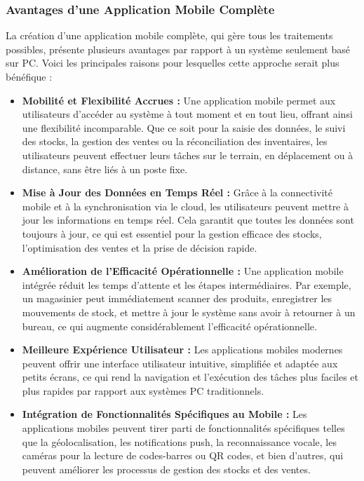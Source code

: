 \documentclass[a4paper, oneside, 12pt, final]{extreport}
\begin{document}
\subsubsection{Avantages d'une Application Mobile Complète}
La création d'une application mobile complète, qui gère tous les traitements possibles, présente plusieurs avantages par rapport à un système seulement basé sur PC. Voici les principales raisons pour lesquelles cette approche serait plus bénéfique :
\begin{itemize}
\item \textbf{Mobilité et Flexibilité Accrues :} Une application mobile permet aux utilisateurs d'accéder au système à tout moment et en tout lieu, offrant ainsi une flexibilité incomparable. Que ce soit pour la saisie des données, le suivi des stocks, la gestion des ventes ou la réconciliation des inventaires, les utilisateurs peuvent effectuer leurs tâches sur le terrain, en déplacement ou à distance, sans être liés à un poste fixe.

\item \textbf{Mise à Jour des Données en Temps Réel :} Grâce à la connectivité mobile et à la synchronisation via le cloud, les utilisateurs peuvent mettre à jour les informations en temps réel. Cela garantit que toutes les données sont toujours à jour, ce qui est essentiel pour la gestion efficace des stocks, l'optimisation des ventes et la prise de décision rapide.

\item \textbf{Amélioration de l'Efficacité Opérationnelle :} Une application mobile intégrée réduit les temps d'attente et les étapes intermédiaires. Par exemple, un magasinier peut immédiatement scanner des produits, enregistrer les mouvements de stock, et mettre à jour le système sans avoir à retourner à un bureau, ce qui augmente considérablement l'efficacité opérationnelle.

\item \textbf{Meilleure Expérience Utilisateur :} Les applications mobiles modernes peuvent offrir une interface utilisateur intuitive, simplifiée et adaptée aux petits écrans, ce qui rend la navigation et l'exécution des tâches plus faciles et plus rapides par rapport aux systèmes PC traditionnels.

\item \textbf{Intégration de Fonctionnalités Spécifiques au Mobile :} Les applications mobiles peuvent tirer parti de fonctionnalités spécifiques telles que la géolocalisation, les notifications push, la reconnaissance vocale, les caméras pour la lecture de codes-barres ou QR codes, et bien d'autres, qui peuvent améliorer les processus de gestion des stocks et des ventes.
\end{itemize}
\end{document}
